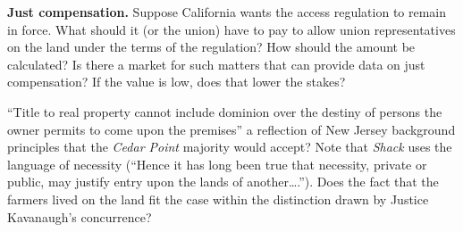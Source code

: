 \item \textbf{Just compensation.} Suppose California wants the access regulation
to remain in force. What should it (or the union) have to pay to allow union
representatives on the land under the terms of the regulation? How should the
amount be calculated? Is there a market for such matters that can provide data
on just compensation? If the value is low, does that lower the stakes?

``Title to real property cannot include dominion over the destiny
of persons the owner permits to come upon the premises'' a reflection of New
Jersey background principles that the \textit{Cedar Point} majority would
accept? Note that \textit{Shack} uses the language of necessity (``Hence it has
long been true that necessity, private or public, may justify entry upon the
lands of another\ldots .''). Does the fact that the farmers lived on the land
fit the case within the distinction drawn by Justice Kavanaugh's concurrence? 
